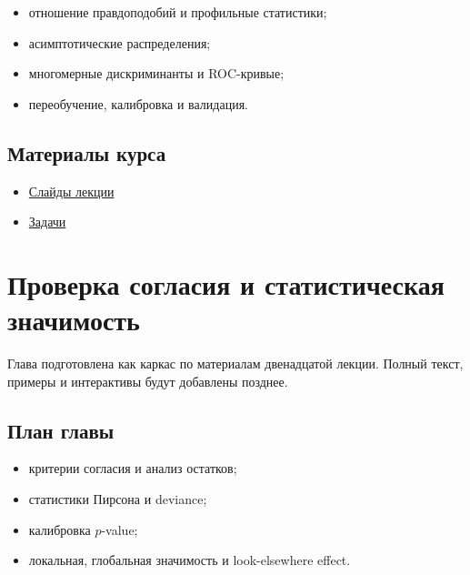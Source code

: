 \documentclass[
  russian,
  12pt,
  a4paper,
  a4paper,
  openany]{scrbook}
\providecommand{\tightlist}{%
  \setlength{\itemsep}{0pt}\setlength{\parskip}{0pt}}
\begin{document}
\begin{itemize}
\tightlist
\item
  отношение правдоподобий и профильные статистики;
\item
  асимптотические распределения;
\item
  многомерные дискриминанты и ROC-кривые;
\item
  переобучение, калибровка и валидация.
\end{itemize}

\section{Материалы
курса}\label{ux43cux430ux442ux435ux440ux438ux430ux43bux44b-ux43aux443ux440ux441ux430-8}

\begin{itemize}
\tightlist
\item
  \href{https://neutrinohit.github.io/statistical-analysis-course/ru/slides/10_test_statistics_and_multivariate_methods.html}{Слайды
  лекции}
\item
  \href{https://neutrinohit.github.io/statistical-analysis-course/ru/slides/exercises/10_test_statistics_and_multivariate_methods_exercises.html}{Задачи}
\end{itemize}

\chapter{Проверка согласия и статистическая
значимость}\label{ux43fux440ux43eux432ux435ux440ux43aux430-ux441ux43eux433ux43bux430ux441ux438ux44f-ux438-ux441ux442ux430ux442ux438ux441ux442ux438ux447ux435ux441ux43aux430ux44f-ux437ux43dux430ux447ux438ux43cux43eux441ux442ux44c}

\begin{bookchapteropening}

Глава подготовлена как каркас по материалам двенадцатой лекции. Полный
текст, примеры и интерактивы будут добавлены позднее.

\end{bookchapteropening}

\section{План
главы}\label{ux43fux43bux430ux43d-ux433ux43bux430ux432ux44b-10}

\begin{itemize}
\tightlist
\item
  критерии согласия и анализ остатков;
\item
  статистики Пирсона и deviance;
\item
  калибровка \(p\)-value;
\item
  локальная, глобальная значимость и look-elsewhere effect.
\end{itemize}
\end{document}
